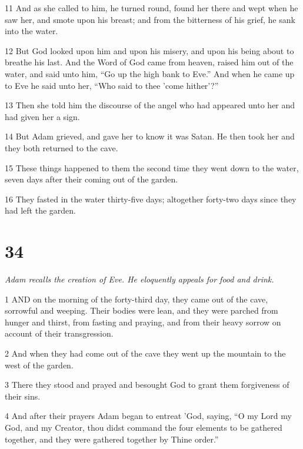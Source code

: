 \par 11 And as she called to him, he turned round, found her there and wept when he saw her, and smote upon his breast; and from the bitterness of his grief, he sank into the water.

\par 12 But God looked upon him and upon his misery, and upon his being about to breathe his last. And the Word of God came from heaven, raised him out of the water, and said unto him, “Go up the high bank to Eve.” And when he came up to Eve he said unto her, “Who said to thee 'come hither'?”

\par 13 Then she told him the discourse of the angel who had appeared unto her and had given her a sign.

\par 14 But Adam grieved, and gave her to know it was Satan. He then took her and they both returned to the cave.

\par 15 These things happened to them the second time they went down to the water, seven days after their coming out of the garden.

\par 16 They fasted in the water thirty-five days; altogether forty-two days since they had left the garden.

\chapter{34}

\par \textit{Adam recalls the creation of Eve. He eloquently appeals for food and drink.}

\par 1 AND on the morning of the forty-third day, they came out of the cave, sorrowful and weeping. Their bodies were lean, and they were parched from hunger and thirst, from fasting and praying, and from their heavy sorrow on account of their transgression.

\par 2 And when they had come out of the cave they went up the mountain to the west of the garden.

\par 3 There they stood and prayed and besought God to grant them forgiveness of their sins.

\par 4 And after their prayers Adam began to entreat 'God, saying, “O my Lord my God, and my Creator, thou didst command the four elements to be gathered together, and they were gathered together by Thine order.”

